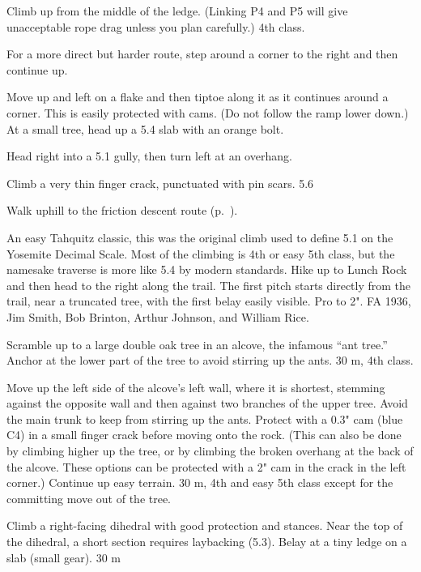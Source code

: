 \documentclass{tahquitz}
\begin{document}
 Climb up from the middle of the ledge. (Linking P4 and P5 will
give unacceptable rope drag unless you plan carefully.) 4th class.

 For a more direct but harder route, step around a corner
to the right and then continue up.

 Move up and left on a flake
and then tiptoe along it as it continues around a corner.
This is easily protected with cams. (Do not follow the ramp lower down.) At a small
tree, head up a 5.4 slab with an orange bolt.

 Head right into a 5.1 gully, then turn left at an overhang.

 Climb a very thin finger crack, punctuated with pin scars. 5.6

Walk uphill to the friction descent route  (p.~\pageref{subsec:friction-descent}).



An easy Tahquitz classic, this was the original climb used to define
5.1 on the Yosemite Decimal Scale. Most of the
climbing is 4th or easy 5th class, but the namesake traverse is more
like 5.4 by modern standards. Hike up to Lunch Rock and then head to the right along the
trail. The first pitch starts directly from the trail, near a 
truncated tree, with the first belay easily visible. Pro to 2". FA
1936, Jim Smith, Bob Brinton, Arthur Johnson, and William Rice.

 Scramble up to a large double oak tree in an alcove, the infamous
``ant tree.'' Anchor at the lower part of the tree to avoid stirring up
the ants. 30 m, 4th class.

 Move up the left side of the alcove's left wall, where it is
shortest, stemming against the opposite wall and then against two  branches
of the upper tree. Avoid the main trunk to keep from stirring up the ants.
Protect with a 0.3" cam (blue C4) in a small
finger crack before moving onto the rock. (This can also be done by
climbing higher up the tree, or by climbing the broken overhang at
the back of the alcove. These options can be protected with a 2" cam
in the crack in the left corner.) Continue up easy terrain. 30 m, 4th and easy 5th class
except for the committing move out of the tree.

 Climb a right-facing dihedral with good protection and
stances. Near the top of the dihedral, a short section requires laybacking (5.3).
Belay at a tiny ledge on a slab (small gear). 30 m
\end{document}
